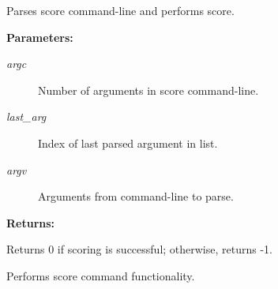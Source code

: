 Parses score command-line and performs score.

\begin{Desc}
\item[{\bf Parameters: }]\par
\begin{description}
\item[
{\em argc}]Number of arguments in score command-line. \item[
{\em last\_\-arg}]Index of last parsed argument in list. \item[
{\em argv}]Arguments from command-line to parse.

\end{description}
\end{Desc}
\begin{Desc}
\item[{\bf Returns: }]\par
Returns 0 if scoring is successful; otherwise, returns -1.

\end{Desc}
Performs score command functionality. 